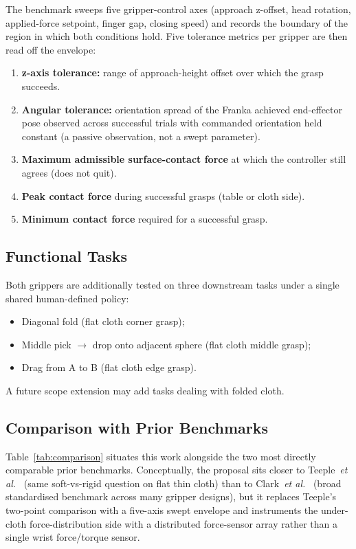 \documentclass[10pt,letterpaper]{article}
\begin{document}
The benchmark sweeps five gripper-control axes (approach z-offset,
head rotation, applied-force setpoint, finger gap, closing speed) and
records the boundary of the region in which both conditions hold. Five
tolerance metrics per gripper are then read off the envelope:
\begin{enumerate}[leftmargin=*,nosep]
    \item \textbf{z-axis tolerance:} range of approach-height offset
          over which the grasp succeeds.
    \item \textbf{Angular tolerance:} orientation spread of the
          Franka achieved end-effector pose observed across successful
          trials with commanded orientation held constant (a passive
          observation, not a swept parameter).
    \item \textbf{Maximum admissible surface-contact force} at which the
          controller still agrees (does not quit).
    \item \textbf{Peak contact force} during successful grasps (table or
          cloth side).
    \item \textbf{Minimum contact force} required for a successful grasp.
\end{enumerate}

\subsection{Functional Tasks}
Both grippers are additionally tested on three downstream tasks under
a single shared human-defined policy:
\begin{itemize}[leftmargin=*,nosep]
    \item Diagonal fold (flat cloth corner grasp);
    \item Middle pick $\rightarrow$ drop onto adjacent sphere (flat
          cloth middle grasp);
    \item Drag from A to B (flat cloth edge grasp).
\end{itemize}
A future scope extension may add tasks dealing with folded cloth.

\subsection{Comparison with Prior Benchmarks}
Table~\ref{tab:comparison} situates this work alongside the two most
directly comparable prior benchmarks. Conceptually, the proposal sits
closer to Teeple~\textit{et al.}~\cite{Teeple2022} (same soft-vs-rigid
question on flat thin cloth) than to Clark~\textit{et al.}~\cite{Clark2023}
(broad standardised benchmark across many gripper designs), but it
replaces Teeple's two-point comparison with a five-axis swept envelope
and instruments the under-cloth force-distribution side with a
distributed force-sensor array rather than a single wrist
force/torque sensor.
\end{document}

